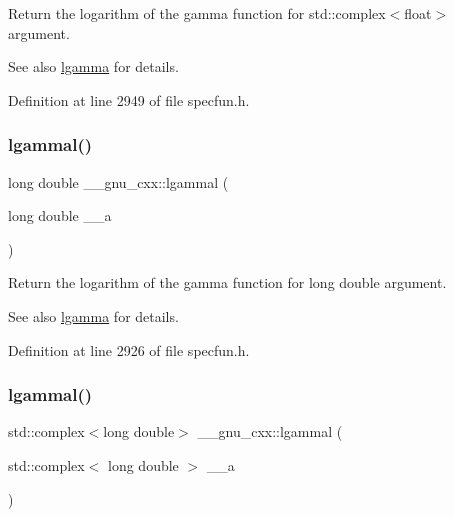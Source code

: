 Return the logarithm of the gamma function for {\ttfamily  std\+::complex$<$float$>$ } argument.

\begin{DoxySeeAlso}{See also}
\hyperlink{group__gnu__math__spec__func_ga40fa5127f7c419ed1d8f1c6a6f96ea9b}{lgamma} for details. 
\end{DoxySeeAlso}


Definition at line 2949 of file specfun.\+h.

\mbox{\label{group__gnu__math__spec__func_gabc66f234f4554cd5ff878792cc85bd37}} 
\subsubsection{\texorpdfstring{lgammal()}{lgammal()}\hspace{0.1cm}{\footnotesize\ttfamily [1/2]}}
{\footnotesize\ttfamily long double \+\_\+\+\_\+gnu\+\_\+cxx\+::lgammal (\begin{DoxyParamCaption}\item[{long double}]{\+\_\+\+\_\+a }\end{DoxyParamCaption})\hspace{0.3cm}{\ttfamily [inline]}}

Return the logarithm of the gamma function for {\ttfamily  long double } argument.

\begin{DoxySeeAlso}{See also}
\hyperlink{group__gnu__math__spec__func_ga40fa5127f7c419ed1d8f1c6a6f96ea9b}{lgamma} for details. 
\end{DoxySeeAlso}


Definition at line 2926 of file specfun.\+h.

\mbox{\label{group__gnu__math__spec__func_ga5f12f60afe9a47f4ca04964f642bbf0d}} 
\subsubsection{\texorpdfstring{lgammal()}{lgammal()}\hspace{0.1cm}{\footnotesize\ttfamily [2/2]}}
{\footnotesize\ttfamily std\+::complex$<$long double$>$ \+\_\+\+\_\+gnu\+\_\+cxx\+::lgammal (\begin{DoxyParamCaption}\item[{std\+::complex$<$ long double $>$}]{\+\_\+\+\_\+a }\end{DoxyParamCaption})\hspace{0.3cm}{\ttfamily [inline]}}

